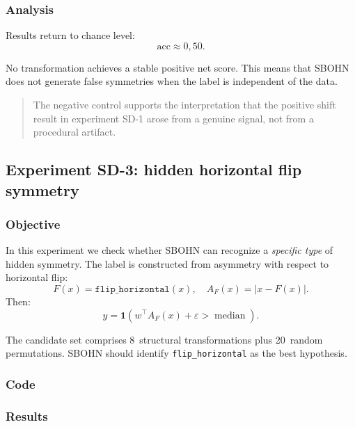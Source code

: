 \documentclass[11pt,a4paper]{report}
\begin{document}
\subsubsection{Analysis}

Results return to chance level:
\[
\mathrm{acc}\approx 0{,}50.
\]

No transformation achieves a stable positive net score. This means that SBOHN does not generate false symmetries when the label is independent of the data.

\begin{quote}
The negative control supports the interpretation that the positive shift result in experiment SD-1 arose from a genuine signal, not from a procedural artifact.
\end{quote}

\subsection{Experiment SD-3: hidden horizontal flip symmetry}

\subsubsection{Objective}

In this experiment we check whether SBOHN can recognize a \emph{specific type} of hidden symmetry. The label is constructed from asymmetry with respect to horizontal flip:
\[
F(x)=\texttt{flip\_horizontal}(x), \quad
A_F(x)=|x-F(x)|.
\]
Then:
\[
y=
\mathbf 1
\left(
w^\top A_F(x)+\varepsilon>
\operatorname{median}
\right).
\]

The candidate set comprises 8~structural transformations plus 20~random permutations. SBOHN should identify \texttt{flip\_horizontal} as the best hypothesis.

\subsubsection{Code}

\noindent{}


\subsubsection{Results}
\end{document}
